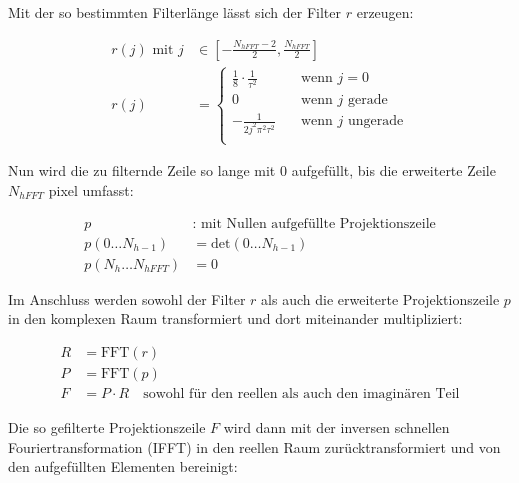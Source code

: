 Mit der so bestimmten Filterlänge lässt sich der Filter $r$ erzeugen:

\begin{equation}\label{eq:filter_gen}
    \begin{aligned}
        r(j) \text{ mit } j &\in \left[-\frac{N_{hFFT} - 2}{2}, \frac{N_{hFFT}}{2}\right]\\
        r(j) &=
            \begin{cases}
                \frac{1}{8} \cdot \frac{1}{\tau^2} & \quad \text{wenn } j = 0\\
                0 & \quad \text{wenn } j \text{ gerade}\\
                -\frac{1}{2j^2\pi^2\tau^2} & \quad \text{wenn } j \text{ ungerade}\\
            \end{cases}
    \end{aligned}
\end{equation}

Nun wird die zu filternde Zeile so lange mit $0$ aufgefüllt, bis die erweiterte Zeile $N_{hFFT}$ \gls{pixel} umfasst:

\begin{equation}
    \begin{aligned}
        p &: \text{ mit Nullen aufgefüllte Projektionszeile}\\
        p(0 \dots N_{h - 1}) &= \text{det}(0 \dots N_{h - 1})\\
        p(N_{h} \dots N_{hFFT}) &= 0
    \end{aligned}
\end{equation}

Im Anschluss werden sowohl der Filter $r$ als auch die erweiterte Projektionszeile $p$ in den komplexen Raum
transformiert und dort miteinander multipliziert:

\begin{equation}
    \begin{aligned}
        R &= \text{FFT}(r)\\
        P &= \text{FFT}(p)\\
        F &= P \cdot R \quad \text{sowohl für den reellen als auch den imaginären Teil}
    \end{aligned}
\end{equation}

Die so gefilterte Projektionszeile $F$ wird dann mit der inversen schnellen Fouriertransformation (IFFT) in den
reellen Raum zurücktransformiert und von den {\glqq}aufgefüllten{\grqq} Elementen bereinigt:


